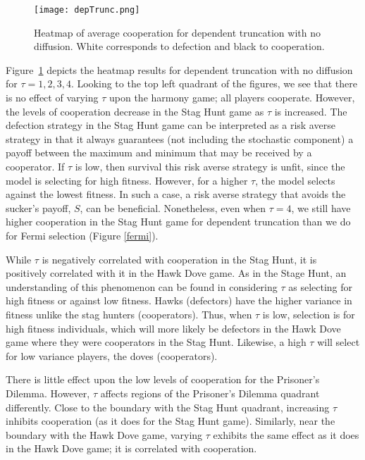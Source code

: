 \documentclass[reprint,aps,pre,twocolumn]{revtex4-1}
\begin{document}
\begin{figure}
\texttt{[image: depTrunc.png]}
\caption{Heatmap of average cooperation for dependent truncation with no diffusion. White corresponds to defection and black to cooperation.}
\label{depTrunc}
\end{figure}

Figure~\ref{depTrunc} depicts the heatmap results for dependent truncation with no diffusion for $\tau = 1, 2, 3, 4$. Looking to the top left quadrant of the figures, we see that there is no effect of varying $\tau$ upon the harmony game; all players cooperate. However, the levels of cooperation decrease in the Stag Hunt game as $\tau$ is increased. The defection strategy in the Stag Hunt game can be interpreted as a risk averse strategy in that it always guarantees (not including the stochastic component) a payoff between the maximum and minimum that may be received by a cooperator. If $\tau$ is low, then survival this risk averse strategy is unfit, since the model is selecting for high fitness. However, for a higher $\tau$, the model selects against the lowest fitness. In such a case, a risk averse strategy that avoids the sucker's payoff, $S$, can be beneficial. Nonetheless, even when $\tau = 4$, we still have higher cooperation in the Stag Hunt game for dependent truncation than we do for Fermi selection (Figure \ref{fermi}).

While $\tau$ is negatively correlated with cooperation in the Stag Hunt, it is positively correlated with it in the Hawk Dove game. As in the Stage Hunt, an understanding of this phenomenon can be found in considering $\tau$ as selecting for high fitness or against low fitness. Hawks (defectors) have the higher variance in fitness unlike the stag hunters (cooperators). Thus, when $\tau$ is low, selection is for high fitness individuals, which will more likely be defectors in the Hawk Dove game where they were cooperators in the Stag Hunt. Likewise, a high $\tau$ will select for low variance players, the doves (cooperators).

There is little effect upon the low levels of cooperation for the Prisoner's Dilemma. However, $\tau$ affects regions of the Prisoner's Dilemma quadrant differently. Close to the boundary with the Stag Hunt quadrant, increasing $\tau$ inhibits cooperation (as it does for the Stag Hunt game). Similarly, near the boundary with the Hawk Dove game, varying $\tau$ exhibits the same effect as it does in the Hawk Dove game; it is correlated with cooperation.
\end{document}
